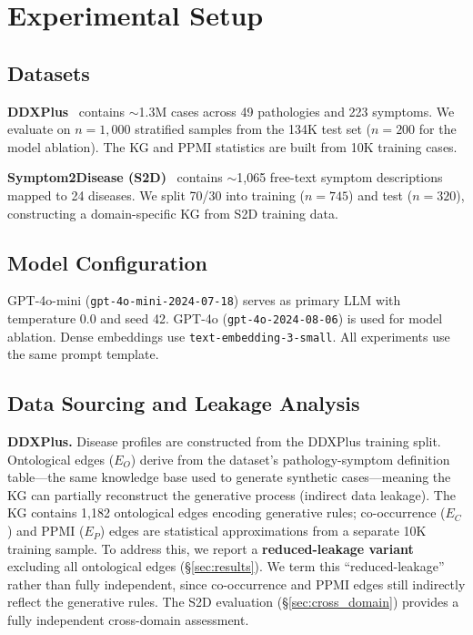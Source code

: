 \documentclass[runningheads]{llncs}
\begin{document}
\section{Experimental Setup}
\label{sec:experiments}

\subsection{Datasets}

\textbf{DDXPlus}~\cite{fansi2022ddxplus} contains ${\sim}$1.3M cases across 49 pathologies and 223 symptoms. We evaluate on $n{=}1{,}000$ stratified samples from the 134K test set ($n{=}200$ for the model ablation). The KG and PPMI statistics are built from 10K training cases.

\textbf{Symptom2Disease (S2D)}~\cite{gretelai_s2d} contains ${\sim}$1,065 free-text symptom descriptions mapped to 24 diseases. We split 70/30 into training ($n{=}745$) and test ($n{=}320$), constructing a domain-specific KG from S2D training data.

\subsection{Model Configuration}

GPT-4o-mini (\texttt{gpt-4o-mini-2024-07-18}) serves as primary LLM with temperature 0.0 and seed 42. GPT-4o (\texttt{gpt-4o-2024-08-06}) is used for model ablation. Dense embeddings use \texttt{text-embedding-3-small}. All experiments use the same prompt template.

\subsection{Data Sourcing and Leakage Analysis}
\label{sec:data_sourcing}

\textbf{DDXPlus.} Disease profiles are constructed from the DDXPlus training split. Ontological edges ($E_O$) derive from the dataset's pathology-symptom definition table---the same knowledge base used to generate synthetic cases---meaning the KG can partially reconstruct the generative process (indirect data leakage). The KG contains 1,182 ontological edges encoding generative rules; co-occurrence ($E_C$) and PPMI ($E_P$) edges are statistical approximations from a separate 10K training sample. To address this, we report a \textbf{reduced-leakage variant} excluding all ontological edges (\S\ref{sec:results}). We term this ``reduced-leakage'' rather than fully independent, since co-occurrence and PPMI edges still indirectly reflect the generative rules. The S2D evaluation (\S\ref{sec:cross_domain}) provides a fully independent cross-domain assessment.
\end{document}
